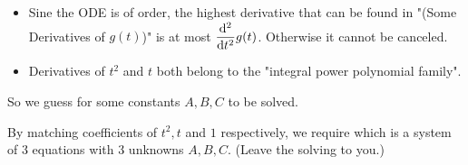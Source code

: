 \documentclass[class=article, crop=false, 12pt]{standalone}
\begin{document}
\begin{example}

    \begin{itemize}
        \item Sine the ODE is of  order, 
        the highest derivative that can be found in "(Some Derivatives of $g(t)$)" is at most $\dvv[2]{t}g(t)$.
        Otherwise it cannot be canceled.

        \item Derivatives of $t^2$ and $t$ both belong to the "integral power polynomial family".

    \end{itemize}

    So we guess 
    for some constants $A,B,C$ to be solved. 


    By matching coefficients of $t^2, t$ and $1$ respectively, we require
    which is a system of 3 equations with 3 unknowns $A,B,C$. (Leave the solving to you.)\\

\end{example}
\end{document}
